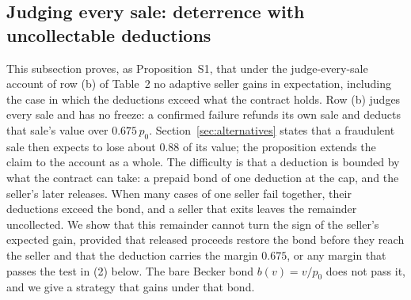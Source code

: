 \documentclass[10pt,a4paper]{article}
\theoremstyle{plain}
\theoremstyle{remark}
\begin{document}
\subsection{Judging every sale: deterrence with uncollectable deductions}
\label{sec:rowb}

This subsection proves, as Proposition~S1, that under the judge-every-sale account of row (b) of Table~2 no adaptive seller gains in expectation, including the case in which the deductions exceed what the contract holds. Row (b) judges every sale and has no freeze: a confirmed failure refunds its own sale and deducts that sale's value over $0.675\,p_0$. Section~\ref{sec:alternatives} states that a fraudulent sale then expects to lose about 0.88 of its value; the proposition extends the claim to the account as a whole. The difficulty is that a deduction is bounded by what the contract can take: a prepaid bond of one deduction at the cap, and the seller's later releases. When many cases of one seller fail together, their deductions exceed the bond, and a seller that exits leaves the remainder uncollected. We show that this remainder cannot turn the sign of the seller's expected gain, provided that released proceeds restore the bond before they reach the seller and that the deduction carries the margin $0.675$, or any margin that passes the test in (2) below. The bare Becker bond $b(v)=v/p_0$ does not pass it, and we give a strategy that gains under that bond.
\end{document}
